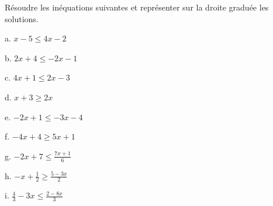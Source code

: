 
Résoudre les inéquations suivantes et représenter sur la droite graduée les solutions.

\begin{description}
\begin{minipage}{0.3\linewidth}

\item[a. ] $x-5 \leq 4x-2$
\item[b. ] $2x+4 \leq -2x-1$
\item[c. ] $4x+1 \leq 2x-3$
\end{minipage}
\begin{minipage}{0.3\linewidth}
\item[d. ] $x+3 \geq 2x$
\item[e. ] $-2x+1 \leq -3x-4$
\item[f. ] $-4x+4 \geq 5x+1$
\end{minipage}
\begin{minipage}{0.3\linewidth}
\item[g. ] $-2x+7 \leq \frac{7x+1}{6}$
\item[h. ] $-x+ \frac{1}{2} \geq \frac{5-3x}{2}$
\item[i. ] $\frac{4}{3}-3x \leq \frac{2-8x}{3}$
\end{minipage}
\end{description}

